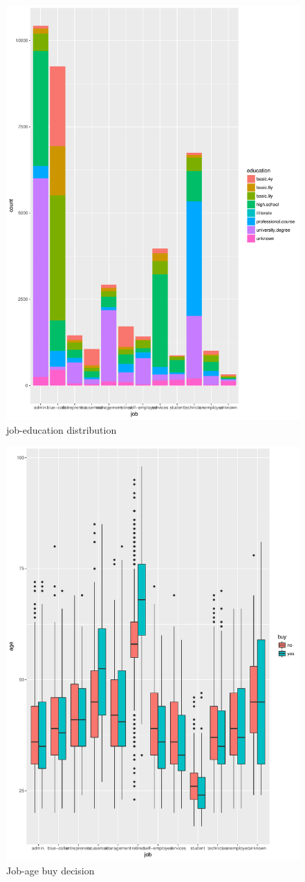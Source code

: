 \documentclass[12pt, a4paper, bibliography=totoc, english]{scrartcl}
\begin{document}
\begin{figure}
	\centering
	\includegraphics[width=0.7\linewidth]{Plot6}
	\caption{job-education distribution}
	\label{fig:plot6}
\end{figure}

\begin{figure}
	\centering
	\includegraphics[width=0.7\linewidth]{Plot7}
	\caption{Job-age buy decision}
	\label{fig:plot7}
\end{figure}
\end{document}
